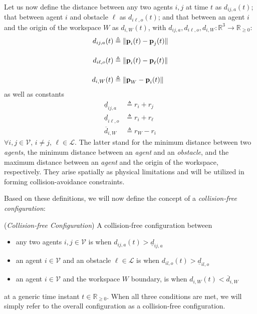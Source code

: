 Let us now define the distance between any two agents $i,j$ at time $t$ as
$d_{ij,a}(t)$; that between agent $i$ and obstacle $\ell$ as $d_{i\ell,o}(t)$;
and that between an agent $i$ and the origin of the workspace $W$ as
$d_{i,W}(t)$, with $d_{ij,a}, d_{i\ell,o}, d_{i,W} : \mathbb{R}^3 \to \mathbb{R}_{\geq 0}$:
\begin{subequations}
	\begin{align}
    d_{ij,a}(t) &\triangleq \| \bm{\mathbf{p}}_i(t) - \bm{\mathbf{p}}_j(t) \| \\[2.5ex]
    d_{i\ell,o}(t) &\triangleq \| \bm{\mathbf{p}}_i(t) - \bm{\mathbf{p}}_\ell(t) \| \\[2.5ex]
    d_{i,W}(t) &\triangleq \| \bm{\mathbf{p}}_W - \bm{\mathbf{p}}_i(t) \|
	\end{align}
\end{subequations}
as well as constants
\begin{subequations}
	\begin{align}
    \underline{d}_{ij, a} &\triangleq r_{i} + r_{j} \\[2.5ex]
    \underline{d}_{i\ell, o} &\triangleq r_{i} + r_{\ell} \\[2.5ex]
    \overline{d}_{i,W} &\triangleq r_W - r_i
	\end{align}
\end{subequations}
$\forall i, j \in \mathcal{V}$, $i \neq j$, $\ell \in \mathcal{L}$.
The latter stand for the minimum distance between two \textit{agents}, the
minimum distance between an \textit{agent} and an \textit{obstacle},
and the maximum distance between an \textit{agent} and the origin of the
workspace, respectively. They arise spatially as physical limitations and will
be utilized in forming collision-avoidance constraints.

Based on these definitions, we will now define the concept of a
\textit{collision-free configuration}:
\begin{bw_box}
\begin{definition} (\textit{Collision-free Configuration})
\label{definition:collision_free_conf}
  A collision-free configuration between
  \begin{itemize}
    \item any two agents $i,j \in \mathcal{V}$ is when $d_{ij,a}(t) > \underline{d}_{ij,a}$
    \item an agent $i \in \mathcal{V}$ and an obstacle $\ell \in \mathcal{L}$
     is when $d_{il,o}(t) > \underline{d}_{il,o}$
    \item an agent $i \in \mathcal{V}$ and the workspace $W$ boundary,
     is when $d_{i,W}(t) < \overline{d}_{i,W}$
  \end{itemize}
  at a generic time instant $t \in \mathbb{R}_{\geq 0}$. When all three
  conditions are met, we will simply refer to the overall configuration as
  a collision-free configuration.
\end{definition}
\end{bw_box}

